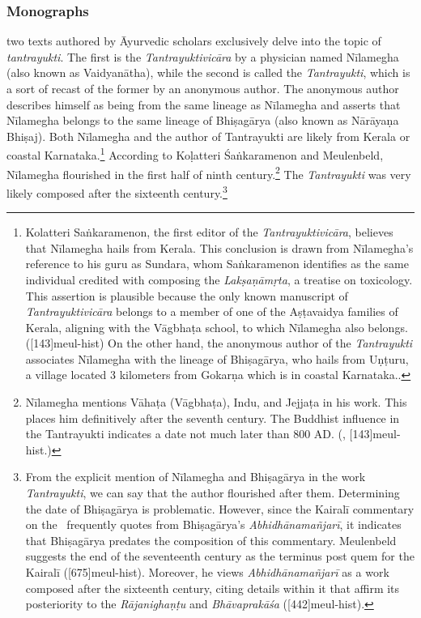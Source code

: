 \subsubsection{Monographs}
two texts authored by Āyurvedic scholars exclusively delve into the topic of \emph{tantrayukti}. The first is the \emph{Tantrayuktivicāra} by a physician named Nīlamegha (also known as Vaidyanātha), while the second is called the \emph{Tantrayukti}, which is a sort of recast of the former by an anonymous author. The anonymous author describes himself as being from the same lineage as Nīlamegha and asserts that Nīlamegha belongs to the same lineage of Bhiṣagārya (also known as Nārāyaṇa Bhiṣaj). Both Nīlamegha and the author of Tantrayukti are likely from Kerala or coastal Karnataka.\footnote{Kolatteri Saṅkaramenon, 
	the first editor of the \emph{Tantrayuktivicāra}, believes that Nīlamegha hails from Kerala. This conclusion is drawn from Nīlamegha's reference to his guru as Sundara, whom Saṅkaramenon identifies as the same individual credited with composing the \emph{Lakṣaṇāmṛta}, a treatise on toxicology. This assertion is plausible because the only known manuscript of \emph{Tantrayuktivicāra} belongs to a member of one of the Aṣṭavaidya families of Kerala, aligning with the Vāgbhaṭa school, to which Nīlamegha also belongs.([143]{meul-hist}) On the other hand, the anonymous author of the \emph{Tantrayukti} associates Nīlamegha with the lineage of Bhiṣagārya, who hails from Uṇṭuru, a village located 3 kilometers from Gokarṇa which is in coastal Karnataka.\parencite[30]{nara-1949}.}
According to Koḷatteri Śaṅkaramenon and Meulenbeld, Nīlamegha flourished in the first half of ninth century.\footnote{Nīlamegha mentions Vāhaṭa (Vāgbhaṭa), Indu, and Jejjaṭa in his work.
	 This places him definitively after the seventh century. The Buddhist influence in the Tantrayukti indicates a date not much later than 800 AD. (\cite[]{muth-1976}, [143]{meul-hist}.)} 
The \emph{Tantrayukti} was very likely composed after the sixteenth century.\footnote{From 
	the explicit mention of Nīlamegha and Bhiṣagārya in the work \emph{Tantrayukti}, we can say that the author flourished after them. Determining the date of Bhiṣagārya is problematic. However, since the Kairalī commentary on the \AHS\ frequently quotes from Bhiṣagārya's \emph{Abhidhānamañjarī}, it indicates that Bhiṣagārya predates the composition of this commentary. Meulenbeld suggests the end of the seventeenth century as the terminus post quem for the Kairalī ([675]{meul-hist}). Moreover, he views \emph{Abhidhānamañjarī} as a work composed after the sixteenth century, citing details within it that affirm its posteriority to the \emph{Rājanighaṇṭu} and \emph{Bhāvaprakāśa} ([442]{meul-hist}).} 

